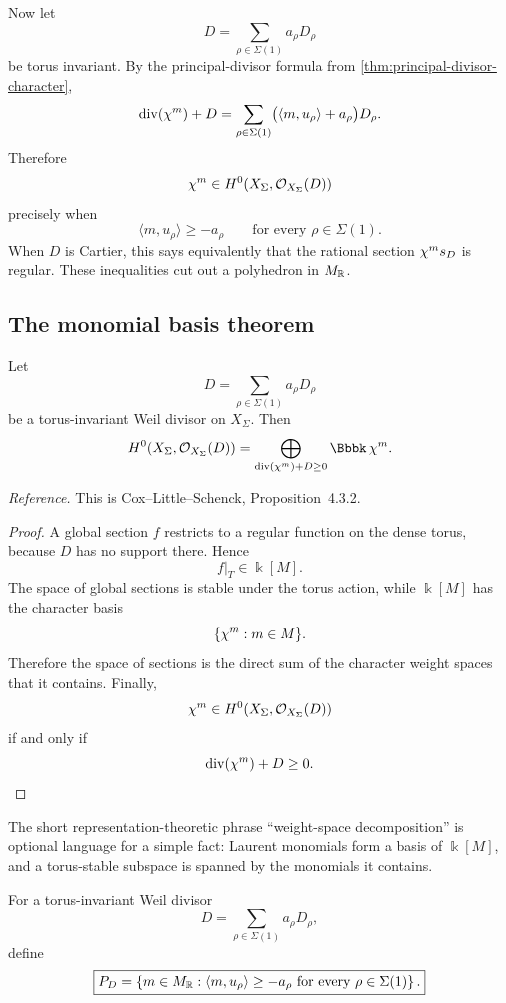 Now let
\[
D=\sum_{\rho\in\Sigma(1)}a_\rho D_\rho
\]
be torus invariant. By the principal-divisor formula from
\cref{thm:principal-divisor-character},
\[
\operatorname{div}(\chi^{m})+D
=
\sum_{\rho\in\Sigma(1)}
\bigl(\langle m,u_\rho\rangle+a_\rho\bigr)D_\rho.
\]
Therefore
\[
\chi^{m}\in H^0(X_\Sigma,\mathcal O_{X_\Sigma}(D))
\]
precisely when
\[
\langle m,u_\rho\rangle\geq-a_\rho
\qquad
\text{for every }\rho\in\Sigma(1).
\]
When \(D\) is Cartier, this says equivalently that the rational
section \(\chi^{m}s_D\) is regular. These inequalities cut out
a polyhedron in \(M_{\mathbb{R}}\).


\subsection{The monomial basis theorem}

\begin{proposition}
\label{prop:global-sections-characters}
Let
\[
D=\sum_{\rho\in\Sigma(1)}a_\rho D_\rho
\]
be a torus-invariant Weil divisor on \(X_\Sigma\). Then
\[
H^0(X_\Sigma,\mathcal O_{X_\Sigma}(D))
=
\bigoplus_{\operatorname{div}(\character{m})+D\geq0}
\Bbbk\,\character{m}.
\]
\end{proposition}

\noindent
\textit{Reference.}
This is Cox--Little--Schenck, Proposition~4.3.2.

\begin{proof}
A global section \(f\) restricts to a regular function on the dense
torus, because \(D\) has no support there. Hence
\[
f|_T\in\Bbbk[M].
\]
The space of global sections is stable under the torus action, while
\(\Bbbk[M]\) has the character basis
\[
\{\chi^{m}:m\in M\}.
\]
Therefore the space of sections is the direct sum of the character
weight spaces that it contains. Finally,
\[
\chi^{m}\in H^0(X_\Sigma,\mathcal O_{X_\Sigma}(D))
\]
if and only if
\[
\operatorname{div}(\chi^{m})+D\geq0.
\]
\end{proof}

\begin{observation}
The short representation-theoretic phrase ``weight-space
decomposition'' is optional language for a simple fact: Laurent
monomials form a basis of \(\Bbbk[M]\), and a torus-stable subspace is
spanned by the monomials it contains.
\end{observation}

\begin{definition}
\label{def:divisor-polyhedron}
For a torus-invariant Weil divisor
\[
D=\sum_{\rho\in\Sigma(1)}a_\rho D_\rho,
\]
define
\[
\boxed{
P_D
=
\left\{
 m\in M_{\mathbb{R}}:
 \langle m,u_\rho\rangle\geq-a_\rho
 \text{ for every }\rho\in\Sigma(1)
\right\}.
}
\]
\end{definition}

